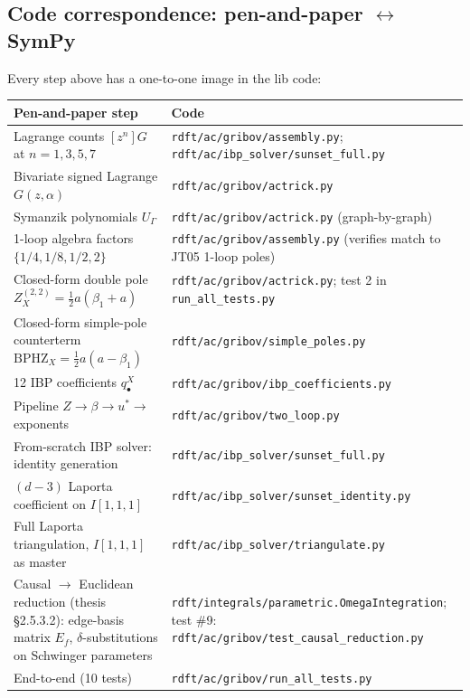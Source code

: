 \documentclass[11pt,a4paper]{article}
\theoremstyle{definition}
\theoremstyle{plain}
\begin{document}
\subsection{Code correspondence: pen-and-paper $\leftrightarrow$ SymPy}
\label{app:code-corresp}

Every step above has a one-to-one image in the lib code:

\begin{center}
\begin{tabular}{@{}p{6.0cm}p{8.5cm}@{}}
\toprule
\textbf{Pen-and-paper step} & \textbf{Code} \\
\midrule
Lagrange counts $[z^n]G$ at $n = 1,3,5,7$
  & \texttt{rdft/ac/gribov/assembly.py};
    \texttt{rdft/ac/ibp\_solver/sunset\_full.py}\\
Bivariate signed Lagrange $G(z, \alpha)$
  & \texttt{rdft/ac/gribov/actrick.py}\\
Symanzik polynomials $U_\Gamma$
  & \texttt{rdft/ac/gribov/actrick.py} (graph-by-graph)\\
1-loop algebra factors $\{1/4, 1/8, 1/2, 2\}$
  & \texttt{rdft/ac/gribov/assembly.py} (verifies match to JT05 1-loop poles)\\
Closed-form double pole
  $Z_X^{(2,2)} = \tfrac12 a(\beta_1{+}a)$
  & \texttt{rdft/ac/gribov/actrick.py};
    test 2 in \texttt{run\_all\_tests.py}\\
Closed-form simple-pole counterterm
  $\mathrm{BPHZ}_X = \tfrac12 a(a{-}\beta_1)$
  & \texttt{rdft/ac/gribov/simple\_poles.py}\\
12 IBP coefficients $q^X_\bullet$
  & \texttt{rdft/ac/gribov/ibp\_coefficients.py}\\
Pipeline $Z \to \beta \to u^* \to$ exponents
  & \texttt{rdft/ac/gribov/two\_loop.py}\\
From-scratch IBP solver: identity generation
  & \texttt{rdft/ac/ibp\_solver/sunset\_full.py}\\
$(d-3)$ Laporta coefficient on $I[1,1,1]$
  & \texttt{rdft/ac/ibp\_solver/sunset\_identity.py}\\
Full Laporta triangulation, $I[1,1,1]$ as master
  & \texttt{rdft/ac/ibp\_solver/triangulate.py}\\
Causal $\to$ Euclidean reduction (thesis \S 2.5.3.2): edge-basis
  matrix $E_f$, $\delta$-substitutions on Schwinger parameters
  & \texttt{rdft/integrals/parametric.OmegaIntegration};\newline
    test \#9: \texttt{rdft/ac/gribov/test\_causal\_reduction.py}\\
End-to-end (10 tests)
  & \texttt{rdft/ac/gribov/run\_all\_tests.py}\\
\bottomrule
\end{tabular}
\end{center}
\end{document}

